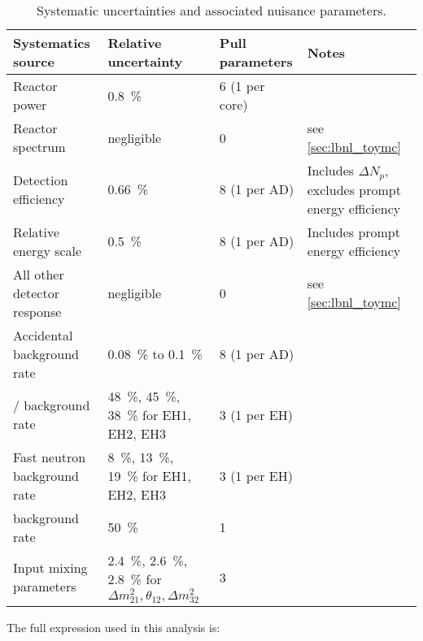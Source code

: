 \begin{table}[ht]
    \centering
    \footnotesize
    \begin{tabular}[t]{lp{3.3cm}lp{3.8cm}}
        \toprule
        Systematics source & Relative uncertainty
                          & Pull parameters
                          & Notes\\
        \midrule
        Reactor power & \SI{0.8}{\percent}
                      & 6 (1 per core) & \\
        Reactor spectrum & negligible
                         & 0
                         & see \cref{sec:lbnl_toymc} \\
        Detection efficiency & \SI{0.66}{\percent}
                             & 8 (1 per AD)
                             & Includes $\Delta N_p$, excludes prompt energy efficiency \\
        Relative energy scale & \SI{0.5}{\percent}
                              & 8 (1 per AD) & Includes prompt energy efficiency \\
        All other detector response & negligible
                                    & 0
                                    & see \cref{sec:lbnl_toymc} \\
        Accidental background rate & \SI{0.08}{\percent} to \SI{0.1}{\percent}
                                   & 8 (1 per AD)
                                   & \\
        \li{}/\he{} background rate &
        \SI{48}{\percent}, \SI{45}{\percent}, \SI{38}{\percent} for EH1, EH2, EH3
                                    & 3 (1 per EH) & \\
        Fast neutron background rate &
        \SI{8}{\percent}, \SI{13}{\percent}, \SI{19}{\percent} for EH1, EH2, EH3
                                     & 3 (1 per EH) & \\
        \amc{} background rate & \SI{50}{\percent}
                             & 1 & \\
        Input mixing parameters &
        \SI{2.4}{\percent}, \SI{2.6}{\percent}, \SI{2.8}{\percent} for
        $\Delta m^2_{21},\theta_{12}, \Delta m^2_{32}$
                                & 3
                                & \\
        \bottomrule
    \end{tabular}
    \caption{Systematic uncertainties and associated nuisance parameters.}
    \label{tab:systs}
\end{table}

The full \chisquare{} expression used in this analysis is:

